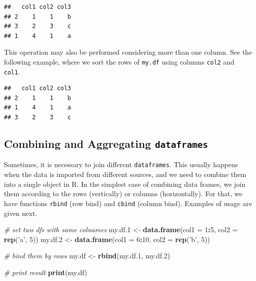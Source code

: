 \documentclass[11pt,]{book}
\newenvironment{Shaded}{\begin{snugshade}}{\end{snugshade}}
\newcommand{\KeywordTok}[1]{\textcolor[rgb]{0.27,0.27,0.27}{\textbf{#1}}}
\newcommand{\DataTypeTok}[1]{\textcolor[rgb]{0.27,0.27,0.27}{#1}}
\newcommand{\DecValTok}[1]{\textcolor[rgb]{0.06,0.06,0.06}{#1}}
\newcommand{\StringTok}[1]{\textcolor[rgb]{0.5,0.5,0.5}{#1}}
\newcommand{\CommentTok}[1]{\textcolor[rgb]{0.56,0.35,0.01}{\textit{#1}}}
\newcommand{\OperatorTok}[1]{\textcolor[rgb]{0.81,0.36,0.00}{\textbf{#1}}}
\newcommand{\NormalTok}[1]{#1}
\begin{document}
\begin{verbatim}
##   col1 col2 col3
## 2    1    1    b
## 3    2    3    c
## 1    4    1    a
\end{verbatim}

This operation may also be performed considering more than one column.
See the following example, where we sort the rows of \texttt{my.df}
using columns \texttt{col2} and \texttt{col1}.

\begin{Shaded}
\end{Shaded}

\begin{verbatim}
##   col1 col2 col3
## 2    1    1    b
## 1    4    1    a
## 3    2    3    c
\end{verbatim}

\subsection{\texorpdfstring{Combining and Aggregating
\texttt{dataframes}}{Combining and Aggregating dataframes}}\label{combining-and-aggregating-dataframes}

Sometimes, it is necessary to join different \texttt{dataframes}. This
usually happens when the data is imported from different sources, and we
need to combine them into a single object in R. In the simplest case of
combining data frames, we join them according to the rows (vertically)
or columns (horizontally). For that, we have functions \texttt{rbind}
(row bind) and \texttt{cbind} (column bind). Examples of usage are given
next.  

\begin{Shaded}
\begin{Highlighting}[]
\CommentTok{# set two dfs with same colnames}
\NormalTok{my.df.}\DecValTok{1}\NormalTok{ <-}\StringTok{ }\KeywordTok{data.frame}\NormalTok{(}\DataTypeTok{col1 =} \DecValTok{1}\OperatorTok{:}\DecValTok{5}\NormalTok{, }\DataTypeTok{col2 =} \KeywordTok{rep}\NormalTok{(}\StringTok{'a'}\NormalTok{, }\DecValTok{5}\NormalTok{))}
\NormalTok{my.df.}\DecValTok{2}\NormalTok{ <-}\StringTok{ }\KeywordTok{data.frame}\NormalTok{(}\DataTypeTok{col1 =} \DecValTok{6}\OperatorTok{:}\DecValTok{10}\NormalTok{, }\DataTypeTok{col2 =} \KeywordTok{rep}\NormalTok{(}\StringTok{'b'}\NormalTok{, }\DecValTok{5}\NormalTok{))}

\CommentTok{# bind them by rows}
\NormalTok{my.df <-}\StringTok{ }\KeywordTok{rbind}\NormalTok{(my.df.}\DecValTok{1}\NormalTok{, my.df.}\DecValTok{2}\NormalTok{)}

\CommentTok{# print result}
\KeywordTok{print}\NormalTok{(my.df)}
\end{Highlighting}
\end{Shaded}
\end{document}
